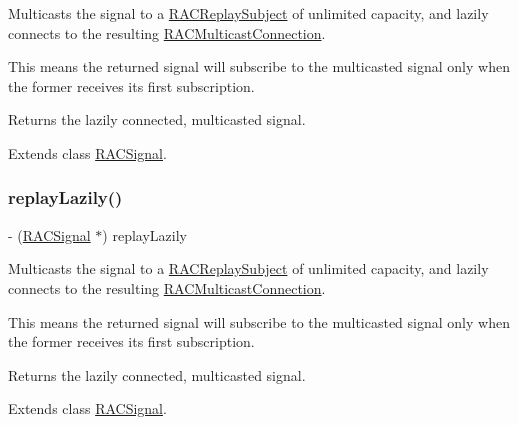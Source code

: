 Multicasts the signal to a \mbox{\hyperlink{interface_r_a_c_replay_subject}{R\+A\+C\+Replay\+Subject}} of unlimited capacity, and lazily connects to the resulting \mbox{\hyperlink{interface_r_a_c_multicast_connection}{R\+A\+C\+Multicast\+Connection}}.

This means the returned signal will subscribe to the multicasted signal only when the former receives its first subscription.

Returns the lazily connected, multicasted signal. 

Extends class \mbox{\hyperlink{interface_r_a_c_signal_aa1a3386d321ec82ceff16d98eaf74d33}{R\+A\+C\+Signal}}.

\mbox{\label{category_r_a_c_signal_07_operations_08_aa1a3386d321ec82ceff16d98eaf74d33}} 
\subsubsection{\texorpdfstring{replay\+Lazily()}{replayLazily()}\hspace{0.1cm}{\footnotesize\ttfamily [2/3]}}
{\footnotesize\ttfamily -\/ (\mbox{\hyperlink{interface_r_a_c_signal}{R\+A\+C\+Signal}} $\ast$) replay\+Lazily \begin{DoxyParamCaption}{ }\end{DoxyParamCaption}}

Multicasts the signal to a \mbox{\hyperlink{interface_r_a_c_replay_subject}{R\+A\+C\+Replay\+Subject}} of unlimited capacity, and lazily connects to the resulting \mbox{\hyperlink{interface_r_a_c_multicast_connection}{R\+A\+C\+Multicast\+Connection}}.

This means the returned signal will subscribe to the multicasted signal only when the former receives its first subscription.

Returns the lazily connected, multicasted signal. 

Extends class \mbox{\hyperlink{interface_r_a_c_signal_aa1a3386d321ec82ceff16d98eaf74d33}{R\+A\+C\+Signal}}.

\mbox{\label{category_r_a_c_signal_07_operations_08_aa1a3386d321ec82ceff16d98eaf74d33}} 
